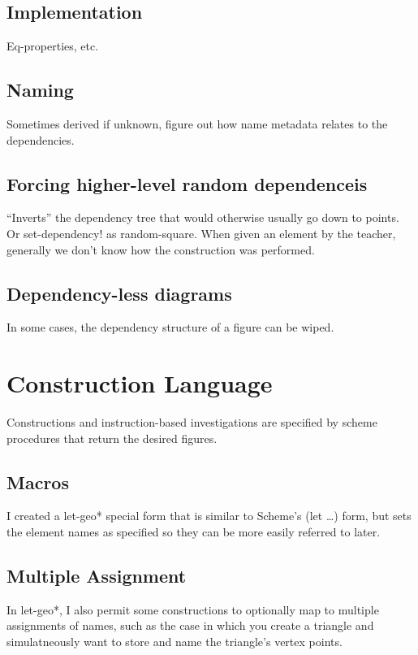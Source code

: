 \subsection{Implementation}

Eq-properties, etc.

\subsection{Naming}

Sometimes derived if unknown, figure out how name metadata relates to
the dependencies.

\subsection{Forcing higher-level random dependenceis}

``Inverts'' the dependency tree that would otherwise usually go
down to points. Or set-dependency! as random-square. When given an
element by the teacher, generally we don't know how the construction
was performed.

\subsection{Dependency-less diagrams}

In some cases, the dependency structure of a figure can be wiped.

\section{Construction Language}

Constructions and instruction-based investigations are specified by
scheme procedures that return the desired figures.

\subsection{Macros}

I created a let-geo* special form that is similar to Scheme's (let
\ldots) form, but sets the element names as specified so they can be more
easily referred to later.

\subsection{Multiple Assignment}

In let-geo*, I also permit some constructions to optionally map to
multiple assignments of names, such as the case in which you create a
triangle and simulatneously want to store and name the triangle's
vertex points.


